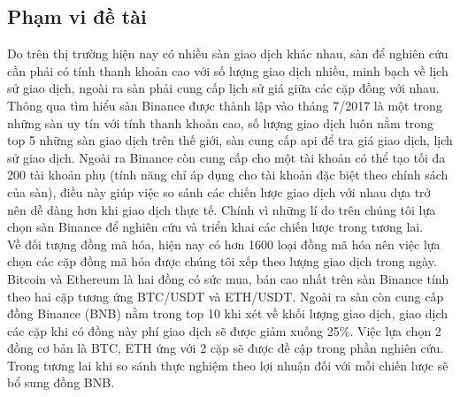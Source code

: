 \subsection{Phạm vi đề tài}
Do trên thị trường hiện nay có nhiều sàn giao dịch khác nhau, sàn để nghiên cứu cần phải có tính thanh khoản cao với số lượng giao dịch nhiều, minh bạch về lịch sử giao dịch, ngoài ra sàn phải cung cấp lịch sử giá giữa các cặp đồng với nhau. Thông qua tìm hiểu sàn Binance được thành lập vào tháng 7/2017 là một trong những sàn uy tín với tính thanh khoản cao, số lượng giao dịch luôn nằm trong top 5 những sàn giao dịch trên thế giới, sàn cung cấp api để tra giá giao dịch, lịch sử giao dịch. Ngoài ra Binance còn cung cấp cho một tài khoản có thể tạo tối đa 200 tài khoản phụ (tính năng chỉ áp dụng cho tài khoản đặc biệt theo chính sách của sàn), điều này giúp việc so sánh các chiến lược giao dịch với nhau dựa trở nên dễ  dàng hơn khi giao dịch thực tế. Chính vì những lí do trên chúng tôi lựa chọn sàn Binance để nghiên cứu và triển khai các chiến lược trong tương lai.\\
Về đối tượng đồng mã hóa, hiện nay có hơn 1600 loại đồng mã hóa nên việc lựa chọn các cặp đồng mã hóa được chúng tôi xếp theo lượng giao dịch trong ngày. Bitcoin và Ethereum là hai đồng có sức mua, bán cao nhất trên sàn Binance tính theo hai cặp tương ứng BTC/USDT và ETH/USDT. Ngoài ra sàn còn cung cấp đồng Binance (BNB) nằm trong top 10 khi xét về  khối lượng giao dịch, giao dịch các cặp khi có đồng này phí giao dịch sẽ được giảm xuống 25\%. Việc lựa chọn 2 đồng cơ bản là BTC, ETH ứng với 2 cặp sẽ được đề cập trong phần nghiên cứu. Trong tương lai khi so sánh thực nghiệm theo lợi nhuận đối với mỗi chiến lược sẽ bổ sung đồng BNB.


